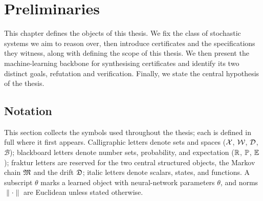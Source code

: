 \normallinespacing

\chapter{Preliminaries}
\label{sec:preliminaries}

This chapter defines the objects of this
thesis. We fix the class of stochastic systems we aim to reason over, then
introduce certificates and the specifications they witness, along with defining the scope of this thesis. We then present the machine-learning backbone for synthesising certificates and identify its two distinct goals, refutation and verification. Finally, we state the central hypothesis of the thesis.

\section{Notation}
\label{sec:notation}

This section collects the symbols used throughout the thesis; each is defined in
full where it first appears. Calligraphic letters denote sets and spaces
($\mathcal{X}$, $\mathcal{W}$, $\mathcal{D}$, $\mathcal{B}$); blackboard letters denote number sets,
probability, and expectation ($\mathbb{R}$, $\mathbb{P}$, $\mathbb{E}$); fraktur letters are
reserved for the two central structured objects, the Markov chain $\mathfrak{M}$ and the
drift $\mathfrak{D}$; italic letters denote scalars, states, and functions. A
subscript $\theta$ marks a learned object with neural-network parameters
$\theta$, and norms $\|\cdot\|$ are Euclidean unless stated otherwise.

